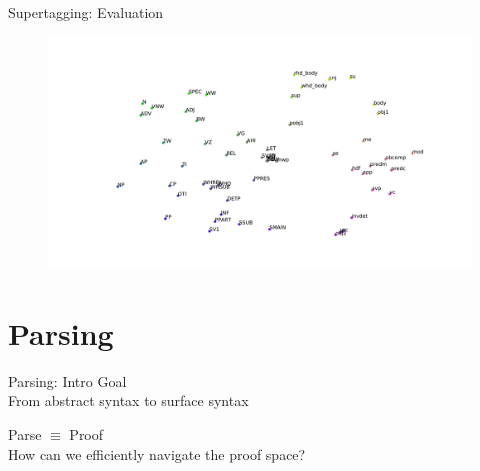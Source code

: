 \documentclass{beamer}
\begin{document}
{
\begin{frame}{Supertagging: Evaluation}

\small
\hspace{20pt}

	\begin{figure}	
	\hspace{-35pt}
	\vspace{30pt}
	\includegraphics[scale=0.25]{cluster.pdf}
\end{figure}	

\end{frame}
}

\section{Parsing}

\begin{frame}{Parsing: Intro}
\alert{Goal}\\
From abstract syntax to surface syntax	

\pause
\alert{Parse $\equiv$ Proof} \\
How can we efficiently navigate the proof space?
\end{frame}
\end{document}
